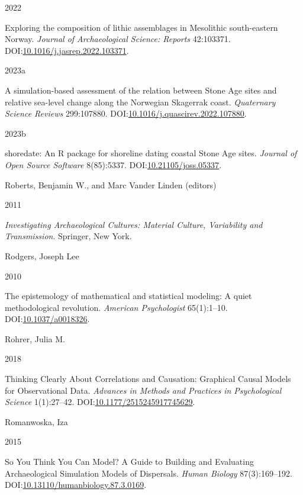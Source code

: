 \documentclass[
  12pt,
  a4paper,
  oneside]{book}
\newlength{\cslhangindent}
\newlength{\csllabelwidth}
\newlength{\cslentryspacingunit} %
\newenvironment{CSLReferences}[2] %
 {%
  \setlength{\parindent}{0pt}
  \ifodd #1
  \let\oldpar\par
  \def\par{\hangindent=\cslhangindent\oldpar}
  \fi
  \setlength{\parskip}{#2\cslentryspacingunit}
 }%
 {}
\newcommand{\CSLBlock}[1]{#1\hfill\break}
\newcommand{\CSLLeftMargin}[1]{\parbox[t]{\csllabelwidth}{#1}}
\newcommand{\CSLRightInline}[1]{\parbox[t]{\linewidth - \csllabelwidth}{#1}\break}
\begin{document}
\begin{CSLReferences}{0}{0}
\leavevmode{}%
\CSLLeftMargin{ 2022 }%
\CSLRightInline{{Exploring the composition of lithic assemblages in Mesolithic south-eastern Norway}. \emph{Journal of Archaeological Science: Reports} 42:103371. DOI:\href{https://doi.org/10.1016/j.jasrep.2022.103371}{10.1016/j.jasrep.2022.103371}.}

\leavevmode{}%
\CSLLeftMargin{ 2023a }%
\CSLRightInline{{A simulation-based assessment of the relation between Stone Age sites and relative sea-level change along the Norwegian Skagerrak coast}. \emph{Quaternary Science Reviews} 299:107880. DOI:\href{https://doi.org/10.1016/j.quascirev.2022.107880}{10.1016/j.quascirev.2022.107880}.}

\leavevmode{}%
\CSLLeftMargin{ 2023b }%
\CSLRightInline{{shoredate: An R package for shoreline dating coastal Stone Age sites}. \emph{Journal of Open Source Software} 8(85):5337. DOI:\href{https://doi.org/10.21105/joss.05337}{10.21105/joss.05337}.}

\leavevmode{}%
\CSLBlock{Roberts, Benjamin W., and Marc Vander Linden (editors)}
\CSLLeftMargin{ 2011}%
\CSLRightInline{\emph{{Investigating Archaeological Cultures: Material Culture, Variability and Transmission}}. Springer, New York.}

\leavevmode{}%
\CSLBlock{Rodgers, Joseph Lee}
\CSLLeftMargin{ 2010}%
\CSLRightInline{{The epistemology of mathematical and statistical modeling: A quiet methodological revolution}. \emph{American Psychologist} 65(1):1--10. DOI:\href{https://doi.org/10.1037/a0018326}{10.1037/a0018326}.}

\leavevmode{}%
\CSLBlock{Rohrer, Julia M.}
\CSLLeftMargin{ 2018}%
\CSLRightInline{{Thinking Clearly About Correlations and Causation: Graphical Causal Models for Observational Data}. \emph{Advances in Methods and Practices in Psychological Science} 1(1):27--42. DOI:\href{https://doi.org/10.1177/2515245917745629}{10.1177/2515245917745629}.}

\leavevmode{}%
\CSLBlock{Romanwoska, Iza}
\CSLLeftMargin{ 2015}%
\CSLRightInline{So You Think You Can Model? A Guide to Building and Evaluating Archaeological Simulation Models of Dispersals. \emph{Human Biology} 87(3):169--192. DOI:\href{https://doi.org/10.13110/humanbiology.87.3.0169}{10.13110/humanbiology.87.3.0169}.}


\end{CSLReferences}
\end{document}
